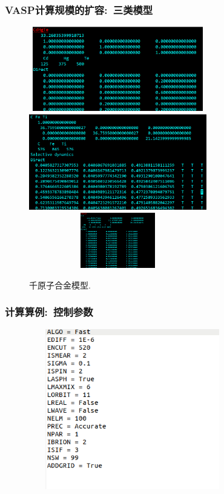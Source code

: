\frame
{
	\frametitle{\textrm{VASP}计算规模的扩容:~三类模型}
\begin{figure}[h!]
\centering
\vskip -0.6in
\includegraphics[height=1.45in,width=3.05in,viewport=0 100 656 429,clip]{Figures/VASP_huge_SJTU-CdHgTe_POSCAR.png}
\vskip -0.6in
\includegraphics[height=1.65in,width=3.05in,viewport=0 150 726 519,clip]{Figures/VASP_huge_USTB-CFeTi_POSCAR.png}
\vskip -0.05in
\includegraphics[height=0.95in,width=3.05in,viewport=0 320 680 543,clip]{Figures/VASP_huge_Ningde-PbONICH_POSCAR.png}
\caption{\tiny \textrm{千原子合金模型.}}%
\label{VASP-huge_Model}
\end{figure} 
}

\frame
{
	\frametitle{计算算例:~控制参数}
\begin{figure}[h!]
\centering
\vskip -0.15in
\includegraphics[height=2.75in,width=3.55in,viewport=0 40 397 366,clip]{Figures/VASP_huge_INCAR.png}
\label{VASP_Contral}
\end{figure} 
}

